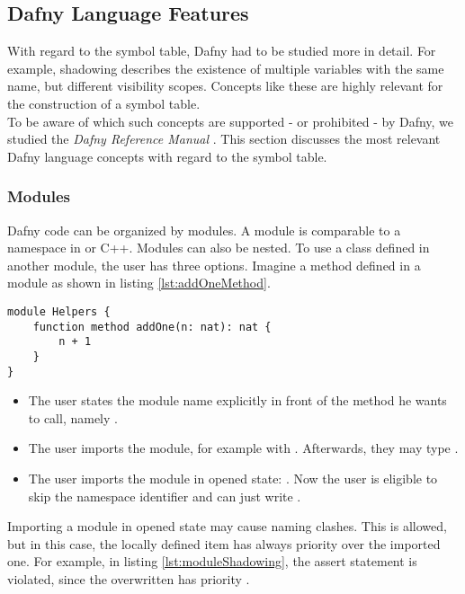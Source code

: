 \subsection{Dafny Language Features}
With regard to the symbol table, Dafny had to be studied more in detail.
For example, shadowing describes the existence of multiple variables with the same name, but different visibility scopes.
Concepts like these are highly relevant for the construction of a symbol table. \\

To be aware of which such concepts are supported - or prohibited - by Dafny, we studied the \textit{Dafny Reference Manual} \cite{dafnyReferenceManual}.
This section discusses the most relevant Dafny language concepts with regard to the symbol table.

\subsubsection{Modules}
Dafny code can be organized by modules.
A module is comparable to a namespace in \CsharpWithSpace or C++.
Modules can also be nested.
To use a class defined in another module, the user has three options.
Imagine a method  defined in a module  as shown in listing \ref{lst:addOneMethod}.

\begin{lstlisting}[language=dafny, caption={Module Example}, captionpos=b, label={lst:addOneMethod}]
module Helpers {
    function method addOne(n: nat): nat {
        n + 1
    }
}
\end{lstlisting}

\begin{itemize}
    \item The user states the module name explicitly in front of the method he wants to call, \linebreak namely .
    \item The user imports the module, for example with .
    Afterwards, they may type .
    \item The user imports the module in opened state: .
    Now the user is eligible to skip the namespace identifier and can just write .
\end{itemize}

Importing a module in opened state may cause naming clashes.
This is allowed, but in this case, the locally defined item has always priority over the imported one.
For example, in listing \ref{lst:moduleShadowing}, the assert statement is violated, since the overwritten  has priority \cite{functionVSMethod}.

